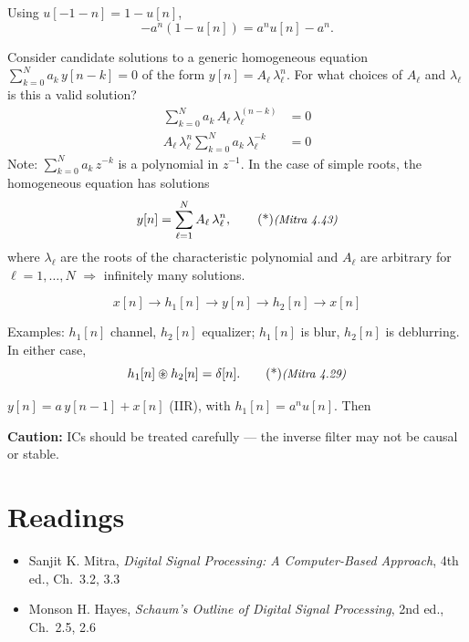 \documentclass[handout_subfiles_root.tex]{subfiles}
\begin{document}
Using $u[-1-n] = 1-u[n]$,
$$-a^n(1-u[n]) = a^n u[n] - a^n.$$

Consider candidate solutions to a generic homogeneous equation
$\sum_{k=0}^{N} a_k\,y[n-k]=0$ of the form $y[n] = A_\ell\,\lambda_\ell^n$.
For what choices of $A_\ell$ and $\lambda_\ell$ is this a valid solution?
\begin{align*}
  \sum_{k=0}^{N} a_k\,A_\ell\,\lambda_\ell^{(n-k)} &= 0 \\
  A_\ell\,\lambda_\ell^n \sum_{k=0}^{N} a_k\,\lambda_\ell^{-k} &= 0
\end{align*}
Note: $\sum_{k=0}^{N} a_k\,z^{-k}$ is a polynomial in $z^{-1}$. In the case
of simple roots, the homogeneous equation has solutions
\begin{equation}
y[n] = \sum_{\ell=1}^{N} A_\ell\,\lambda_\ell^n,\MitraTag{4.43}
\end{equation}
where $\lambda_\ell$ are the roots of the characteristic polynomial  and $A_\ell$ are
arbitrary for $\ell=1,\ldots,N$ $\Rightarrow$ infinitely many solutions.


$$x[n] \to \boxed{h_1[n]} \to y[n] \to \boxed{h_2[n]} \to x[n]$$

\noindent Examples: $h_1[n]$ channel, $h_2[n]$ equalizer; $h_1[n]$ is blur,
$h_2[n]$ is deblurring. In either case,
\begin{equation}
h_1[n]\circledast h_2[n] = \delta[n].\MitraTag{4.29}
\end{equation}

\begin{examplebox}[title={Example}]
$y[n] = a\,y[n-1] + x[n]$ (IIR), with $h_1[n] = a^n u[n]$. Then
\end{examplebox}

\noindent\textbf{Caution:} ICs should be treated carefully --- the inverse
filter may not be causal or stable.

\section*{Readings}
\begin{itemize}
  \item Sanjit K. Mitra, \textit{Digital Signal Processing: A Computer-Based Approach}, 4th ed., Ch.\ 3.2, 3.3
  \item Monson H. Hayes, \textit{Schaum's Outline of Digital Signal Processing}, 2nd ed., Ch.\ 2.5, 2.6
\end{itemize}
\end{document}
